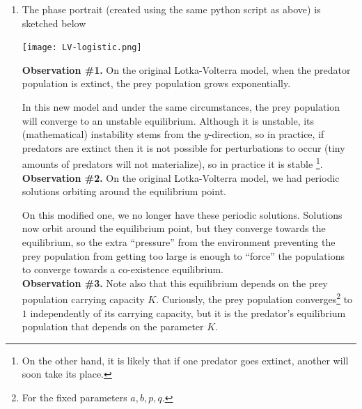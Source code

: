 \begin{enumerate}
\begin{enumerate}
	\item The phase portrait (created using the same python script as above) is sketched below
	
	\begin{center}
	\texttt{[image: LV-logistic.png]}
	\end{center}
	
	\textbf{Observation \#1.} On the original Lotka-Volterra model, when the predator population is extinct, the prey population grows exponentially.
	
	In this new model and under the same circumstances, the prey population will converge to an unstable equilibrium. Although it is unstable, its (mathematical) instability stems from the $y$-direction, so in practice, if predators are extinct then it is not possible for perturbations to occur (tiny amounts of predators will not materialize), so in practice it is stable \footnote{On the other hand, it is likely that if one predator goes extinct, another will soon take its place.}. \\
	
	\textbf{Observation \#2.} On the original Lotka-Volterra model, we had periodic solutions orbiting around the equilibrium point.
	
	On this modified one, we no longer have these periodic solutions. Solutions now orbit around the equilibrium point, but they converge towards the equilibrium, so the extra ``pressure'' from the environment preventing the prey population from getting too large is enough to ``force'' the populations to converge towards a co-existence equilibrium.  \\
	
	\textbf{Observation \#3.} Note also that this equilibrium depends on the prey population carrying capacity $K$. Curiously, the prey population converges\footnote{For the fixed parameters $a,b,p,q$.} to $1$ independently of its carrying capacity, but it is the predator's equilibrium population that depends on the parameter $K$.

	
\end{enumerate}	
\end{enumerate}
